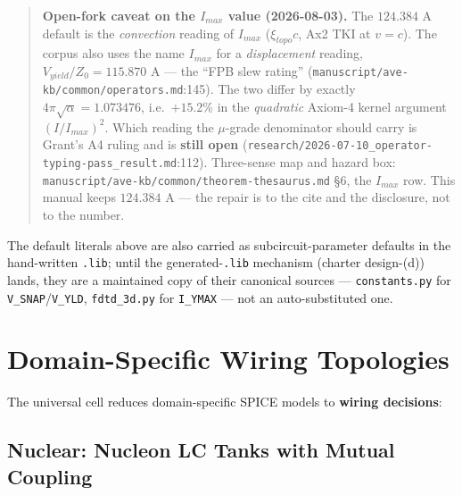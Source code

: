 \begin{quote}
\small
\textbf{Open-fork caveat on the $I_{max}$ value (2026-08-03).}  The
$124.384$ A default is the \emph{convection} reading of $I_{max}$
($\xi_{topo}c$, Ax2 TKI at $v=c$).  The corpus also uses the name $I_{max}$
for a \emph{displacement} reading, $V_{yield}/Z_0 = 115.870$ A --- the
``FPB slew rating'' (\texttt{manuscript/ave-kb/common/operators.md}:145).
The two differ by exactly $4\pi\sqrt{\alpha} = 1.073476$, i.e.\ $+15.2\%$ in
the \emph{quadratic} Axiom-4 kernel argument $(I/I_{max})^2$.  Which reading
the $\mu$-grade denominator should carry is Grant's A4 ruling and is
\textbf{still open}
(\texttt{research/2026-07-10\_operator-typing-pass\_result.md}:112).  Three-sense
map and hazard box: \texttt{manuscript/ave-kb/common/theorem-thesaurus.md}
\S6, the $I_{max}$ row.  This manual keeps $124.384$ A --- the repair is to the
cite and the disclosure, not to the number.
\end{quote}
The default literals above are also carried as subcircuit-parameter defaults in
the hand-written \texttt{.lib}; until the generated-\texttt{.lib} mechanism
(charter design-(d)) lands, they are a maintained copy of their canonical
sources --- \texttt{constants.py} for \texttt{V\_SNAP}/\texttt{V\_YLD},
\texttt{fdtd\_3d.py} for \texttt{I\_YMAX} --- not an auto-substituted one.


\section{Domain-Specific Wiring Topologies}
\label{sec:spice_topologies}

The universal cell reduces domain-specific SPICE models to
\textbf{wiring decisions}:

\subsection{Nuclear: Nucleon LC Tanks with Mutual Coupling}

